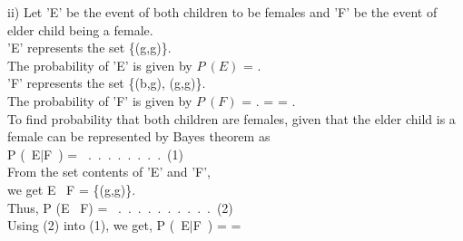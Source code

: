 \documentclass[journal,12pt,twocolumn]{IEEEtran}
\begin{document}
ii) Let 'E' be the event of both children to be females and 'F' be the event of elder child being a female.\\
    
\hspace{25}    'E' represents the set \{(g,g)\}.\\
    
    The probability of 'E' is given by $P\ (E)$ = .\\
    
    'F' represents the set \{(b,g), (g,g)\}.\\
    
    The probability of 'F' is given by $P\ (F)$ = . = = .\\
    
    To find probability that both children are females, given that the elder child is
    a female can be represented by Bayes theorem as\\
    
    P (\ E\;$|$\;F\  ) = \ .\ .\ .\ .\ .\ .\ .\ .\ (1)\\
    
    From the set contents of 'E' and 'F',\\ we get E \cap\ F = \{(g,g)\}.\\
    
    Thus, P (E \cap\ F) = \ .\ .\ .\ .\ .\ .\ .\ .\ .\ .\ (2)\\
    
    Using (2) into (1), we get, P (\ E\;$|$\;F\  )
    =  = \\    
\end{document}

